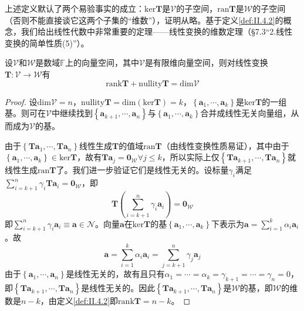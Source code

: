 \documentclass[main.tex]{subfiles}
\begin{document}
上述定义默认了两个易验事实的成立：$\mathrm{ker}\mathbf{T}$是$\mathcal{V}$的子空间，$\mathrm{ran}\mathbf{T}$是$\mathcal{W}$的子空间（否则不能直接谈它这两个子集的“维数”），证明从略\cite[\S7.3“2.线性变换的简单性质(4)”p.~177]{周胜林2012线性代数}。基于定义\ref{def:II.4.2}的概念，我们给出线性代数中非常重要的定理——线性变换的维数定理（\S7.3“2.线性变换的简单性质(5)”\cite[p.~178]{周胜林2012线性代数}）。

\begin{theorem}[线性变换的维数定理]\label{thm:II.4.3}
设$\mathcal{V}$和$\mathcal{W}$是数域$\mathbb{F}$上的向量空间，其中$\mathcal{V}$是有限维向量空间，则对线性变换$\mathbf{T}:\mathcal{V}\rightarrow\mathcal{W}$有
\[
\mathrm{rank}\mathbf{T}+\mathrm{nullity}\mathbf{T}=\mathrm{dim}\mathcal{V}
\]
\end{theorem}
\begin{proof}
设$\mathrm{dim}\mathcal{V}=n$，$\mathrm{nullity}\mathbf{T}=\mathrm{dim}\left(\mathrm{ker}\mathbf{T}\right)=k$，$\left\{\mathbf{a}_1,\cdots,\mathbf{a}_k\right\}$是$\mathrm{ker}\mathbf{T}$的一组基。则可在$\mathcal{V}$中继续找到$\left\{\mathbf{a}_{k+1},\cdots,\mathbf{a}_{n}\right\}$与$\left\{\mathbf{a}_1,\cdots,\mathbf{a}_k\right\}$合并成线性无关向量组，从而成为$\mathcal{V}$的基。

由于$\left\{\mathbf{Ta}_1,\cdots,\mathbf{Ta}_n\right\}$线性生成$\mathbf{T}$的值域$\mathrm{ran}\mathbf{T}$（由线性变换性质易证），其中由于$\left\{\mathbf{a}_1,\cdots,\mathbf{a}_k\right\}\in\mathrm{ker}\mathbf{T}$，故有$\mathbf{Ta}_j=\mathbf{0}_\mathcal{W}\forall j\leq k$，所以实际上仅$\left\{\mathbf{Ta}_{k+1},\cdots,\mathbf{Ta}_n\right\}$就线性生成$\mathrm{ran}\mathbf{T}$了。我们进一步验证它们是线性无关的。设标量$\gamma_i$满足$\sum_{i=k+1}^n\gamma_i\mathbf{Ta}_i=\mathbf{0}_\mathcal{W}$，即
\[\mathbf{T}\left(\sum_{i=k+1}^n\gamma_i\mathbf{a}_i\right)=\mathbf{0}_\mathcal{W}\]
即$\sum_{i=k+1}^n\gamma_i\mathbf{a}_i\equiv\mathbf{a}\in\mathcal{N}$。向量$\mathbf{a}$在$\mathrm{ker}\mathbf{T}$的基$\left\{\mathbf{a}_1,\cdots,\mathbf{a}_k\right\}$下表示为$\mathbf{a}=\sum_{i=1}^k\alpha_i\mathbf{a}_i$。故
\[
\mathbf{a}=\sum_{i=1}^k\alpha_i\mathbf{a}_i=\sum_{j=k+1}^n\gamma_j\mathbf{a}_j
\]
由于$\left\{\mathbf{a}_1,\cdots,\mathbf{a}_n\right\}$是线性无关的，故有且只有$\alpha_1=\cdots=\alpha_k=\gamma_{k+1}=\cdots=\gamma_n=0$，即$\left\{\mathbf{Ta}_{k+1},\cdots,\mathbf{Ta}_n\right\}$是线性无关的。因此$\left\{\mathbf{Ta}_{k+1},\cdots,\mathbf{Ta}_n\right\}$是$\mathcal{W}$的基，即$\mathcal{W}$的维数是$n-k$，由定义\ref{def:II.4.2}即$\mathrm{rank}\mathbf{T}=n-k$。
\end{proof}
\end{document}
